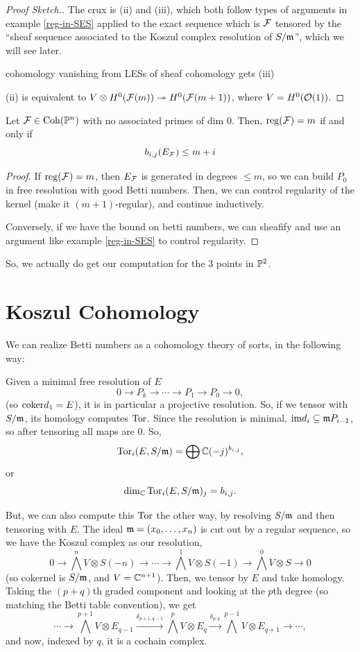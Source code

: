 \documentclass[12pt]{article}
\begin{document}
\begin{proof}[Proof Sketch.]
    The crux is (ii) and (iii), which both follow types of arguments in example \ref{reg-in-SES} applied to the exact sequence which is $\cF$ tensored by the ``sheaf sequence associated to the Koszul complex resolution of $S/\fm$'', which we will see later.

    cohomology vanishing from LESs of sheaf cohomology gets (iii)

    (ii) is equivalent to $V\otimes H^0(\cF(m)) \twoheadrightarrow H^0(\cF(m+1))$, where $V= H^0(\cO(1))$.
\end{proof}

\begin{thm}
    Let $\cF\in \Coh(\P^n)$ with no associated primes of dim 0. Then, $\reg(\cF)=m$ if and only if
    \[b_{i,j}(E_\cF) \leq m+i\]
\end{thm}

\begin{proof}
    If $\reg(\cF)=m$, then $E_\cF$ is generated in degrees $\leq m$, so we can build $P_0$ in free resolution with good Betti numbers. Then, we can control regularity of the kernel (make it $(m+1)$-regular), and continue inductively.

    Conversely, if we have the bound on betti numbers, we can sheafify and use an argument like example \ref{reg-in-SES} to control regularity.
\end{proof}

So, we actually do get our computation for the 3 points in $\P^2$.

\section{Koszul Cohomology}

We can realize Betti numbers as a cohomology theory of sorts, in the following way:

Given a minimal free resolution of $E$
\[0 \to P_k \to \cdots \to P_1 \to P_0 \to 0,\]
(so $\coker d_1 = E$), it is in particular a projective resolution. So, if we tensor with $S/\fm$, its homology computes $\Tor$. Since the resolution is minimal, $\im d_i \subseteq \fm P_{i-1}$, so after tensoring all maps are 0. So,
\[\Tor_i(E,S/\fm) = \bigoplus \C(-j)^{b_{i,j}},\]
or
\[\dim_\C \Tor_i(E,S/\fm)_j = b_{i,j}.\]

But, we can also compute this $\Tor$ the other way, by resolving $S/\fm$ and then tensoring with $E$. The ideal $\fm=(x_0,\dots,x_n)$ is cut out by a regular sequence, so we have the Koszul complex as our resolution,
\[0\to\bigwedge^n V \otimes S(-n) \to \cdots \to \bigwedge^1 V \otimes S(-1) \to \bigwedge^0 V \otimes S \to 0\]
(so cokernel is $S/\fm$, and $V=\C^{n+1}$). Then, we tensor by $E$ and take homology. Taking the $(p+q)$th graded component and looking at the $p$th degree (so matching the Betti table convention), we get
\[\cdots \to \bigwedge^{p+1} V \otimes E_{q-1} \xrightarrow{\delta_{p+1,q-1}} \bigwedge^p V \otimes E_q \xrightarrow{\delta_{p,q}} \bigwedge^{p-1} V \otimes E_{q+1} \to \cdots,\]
and now, indexed by $q$, it is a cochain complex.
\end{document}
